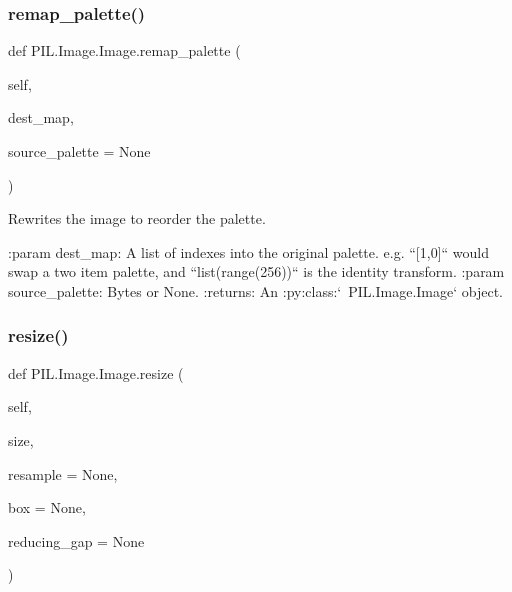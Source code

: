 \subsubsection{\texorpdfstring{remap\+\_\+palette()}{remap\_palette()}}
{\footnotesize\ttfamily def P\+I\+L.\+Image.\+Image.\+remap\+\_\+palette (\begin{DoxyParamCaption}\item[{}]{self,  }\item[{}]{dest\+\_\+map,  }\item[{}]{source\+\_\+palette = {\ttfamily None} }\end{DoxyParamCaption})}

\begin{DoxyVerb}Rewrites the image to reorder the palette.

:param dest_map: A list of indexes into the original palette.
   e.g. ``[1,0]`` would swap a two item palette, and ``list(range(256))``
   is the identity transform.
:param source_palette: Bytes or None.
:returns:  An :py:class:`~PIL.Image.Image` object.\end{DoxyVerb}
 \mbox{\label{classPIL_1_1Image_1_1Image_a6a1cd79a8541edf02c0fb94127b9e217}} 
\subsubsection{\texorpdfstring{resize()}{resize()}}
{\footnotesize\ttfamily def P\+I\+L.\+Image.\+Image.\+resize (\begin{DoxyParamCaption}\item[{}]{self,  }\item[{}]{size,  }\item[{}]{resample = {\ttfamily None},  }\item[{}]{box = {\ttfamily None},  }\item[{}]{reducing\+\_\+gap = {\ttfamily None} }\end{DoxyParamCaption})}

